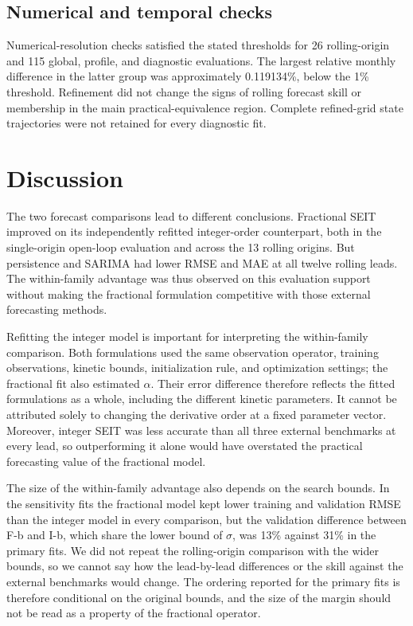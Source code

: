\documentclass[pdflatex,sn-mathphys-ay]{sn-jnl}
\begin{document}
\subsection{Numerical and temporal checks}

Numerical-resolution checks satisfied the stated thresholds for 26 rolling-origin and 115 global, profile, and diagnostic evaluations. The largest relative monthly difference in the latter group was approximately 0.119134\%, below the 1\% threshold. Refinement did not change the signs of rolling forecast skill or membership in the main practical-equivalence region. Complete refined-grid state trajectories were not retained for every diagnostic fit.

\section{Discussion}

The two forecast comparisons lead to different conclusions. Fractional SEIT improved on its independently refitted integer-order counterpart, both in the single-origin open-loop evaluation and across the 13 rolling origins. But persistence and SARIMA had lower RMSE and MAE at all twelve rolling leads. The within-family advantage was thus observed on this evaluation support without making the fractional formulation competitive with those external forecasting methods.

Refitting the integer model is important for interpreting the within-family comparison. Both formulations used the same observation operator, training observations, kinetic bounds, initialization rule, and optimization settings; the fractional fit also estimated $\alpha$. Their error difference therefore reflects the fitted formulations as a whole, including the different kinetic parameters. It cannot be attributed solely to changing the derivative order at a fixed parameter vector. Moreover, integer SEIT was less accurate than all three external benchmarks at every lead, so outperforming it alone would have overstated the practical forecasting value of the fractional model.

The size of the within-family advantage also depends on the search bounds. In the sensitivity fits the fractional model kept lower training and validation RMSE than the integer model in every comparison, but the validation difference between F-b and I-b, which share the lower bound of $\sigma$, was 13\% against 31\% in the primary fits. We did not repeat the rolling-origin comparison with the wider bounds, so we cannot say how the lead-by-lead differences or the skill against the external benchmarks would change. The ordering reported for the primary fits is therefore conditional on the original bounds, and the size of the margin should not be read as a property of the fractional operator.
\end{document}

